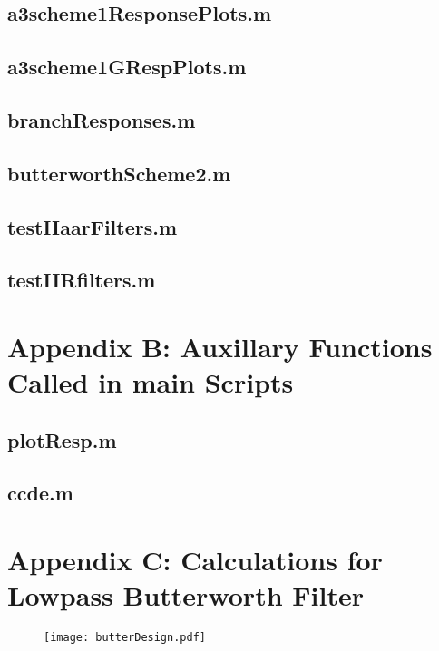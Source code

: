 \documentclass[12pt]{scrartcl} %
\begin{document}
		\subsection{a3scheme1ResponsePlots.m}
							
		\subsection{a3scheme1GRespPlots.m}
							
		\subsection{branchResponses.m}							
									
		\subsection{butterworthScheme2.m}							
														
		\subsection{testHaarFilters.m}											
							
		\subsection{testIIRfilters.m}							
							
							
		\section{Appendix B: Auxillary Functions Called in main Scripts }
		
				\subsection{plotResp.m}
					
				\subsection{ccde.m}							
								
					
		\section{Appendix C: Calculations for Lowpass Butterworth Filter}
		\begin{figure}[h]
			\texttt{[image: butterDesign.pdf]}
		\end{figure}
	
\end{document}
